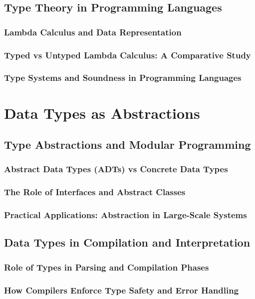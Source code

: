 \documentclass[12pt, oneside]{book}
\begin{document}
\subsection{Type Theory in Programming Languages}
\subsubsection{Lambda Calculus and Data Representation}
\subsubsection{Typed vs Untyped Lambda Calculus: A Comparative Study}
\subsubsection{Type Systems and Soundness in Programming Languages}

\section{Data Types as Abstractions}
\subsection{Type Abstractions and Modular Programming}
\subsubsection{Abstract Data Types (ADTs) vs Concrete Data Types}
\subsubsection{The Role of Interfaces and Abstract Classes}
\subsubsection{Practical Applications: Abstraction in Large-Scale Systems}
\subsection{Data Types in Compilation and Interpretation}
\subsubsection{Role of Types in Parsing and Compilation Phases}
\subsubsection{How Compilers Enforce Type Safety and Error Handling}
\end{document}
